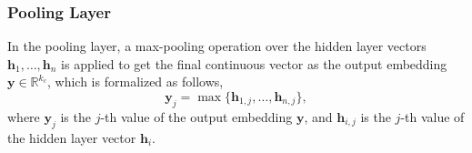\documentclass[11pt,a4paper]{article}
\begin{document}
\subsubsection{Pooling Layer}
In the pooling layer, a max-pooling operation over the hidden layer vectors ${\mathbf{h}_1, \ldots , \mathbf{h}_n}$ is applied to get the final continuous vector as the output embedding $\mathbf{y} \in \mathbb{R}^{k_c} $, which is formalized as follows,
\begin{equation}
\mathbf{y}_{j} = \max \{\mathbf{h}_{1,j}, \ldots, \mathbf{h}_{n,j} \},
\end{equation}
where $\mathbf{y}_{j}$ is the $j$-th value of the output embedding $\mathbf{y}$, and $\mathbf{h}_{i,j}$ is the $j$-th value of the hidden layer vector $\mathbf{h}_i$.




\end{document}
